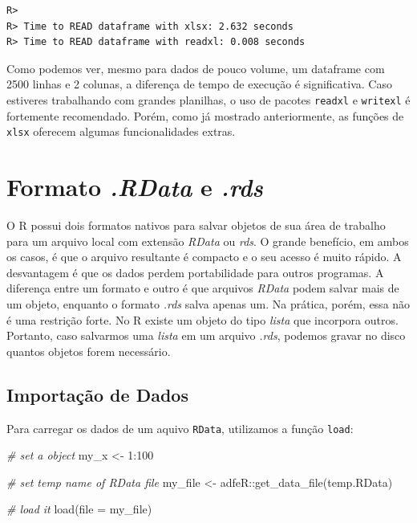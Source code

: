 \documentclass[
  11pt,
]{book}
\newenvironment{Shaded}{\begin{snugshade}}{\end{snugshade}}
\newcommand{\AttributeTok}[1]{\textcolor[rgb]{0.61,0.61,0.61}{#1}}
\newcommand{\CommentTok}[1]{\textcolor[rgb]{0.37,0.37,0.37}{\textit{#1}}}
\newcommand{\DecValTok}[1]{\textcolor[rgb]{0.06,0.06,0.06}{#1}}
\newcommand{\FunctionTok}[1]{\textcolor[rgb]{0,0,0}{#1}}
\newcommand{\NormalTok}[1]{#1}
\newcommand{\OtherTok}[1]{\textcolor[rgb]{0.37,0.37,0.37}{#1}}
\newcommand{\SpecialCharTok}[1]{\textcolor[rgb]{0,0,0}{#1}}
\newcommand{\StringTok}[1]{\textcolor[rgb]{0.5,0.5,0.5}{#1}}
\begin{document}
\begin{verbatim}
R> 
R> Time to READ dataframe with xlsx: 2.632 seconds
R> Time to READ dataframe with readxl: 0.008 seconds
\end{verbatim}

Como podemos ver, mesmo para dados de pouco volume, um dataframe com 2500 linhas e 2 colunas, a diferença de tempo de execução é significativa. Caso estiveres trabalhando com grandes planilhas, o uso de pacotes \texttt{readxl} e \texttt{writexl} é fortemente recomendado. Porém, como já mostrado anteriormente, as funções de \texttt{xlsx} oferecem algumas funcionalidades extras.

\hypertarget{formato-.rdata-e-.rds}{%
\section{\texorpdfstring{Formato \emph{.RData} e \emph{.rds}}{Formato .RData e .rds}}\label{formato-.rdata-e-.rds}}

O R possui dois formatos nativos para salvar objetos de sua área de trabalho para um arquivo local com extensão \emph{RData} ou \emph{rds}. O grande benefício, em ambos os casos, é que o arquivo resultante é compacto e o seu acesso é muito rápido. A desvantagem é que os dados perdem portabilidade para outros programas. A diferença entre um formato e outro é que arquivos \emph{RData} podem salvar mais de um objeto, enquanto o formato \emph{.rds} salva apenas um. Na prática, porém, essa não é uma restrição forte. No R existe um objeto do tipo \emph{lista} que incorpora outros. Portanto, caso salvarmos uma \emph{lista} em um arquivo \emph{.rds}, podemos gravar no disco quantos objetos forem necessário.

\hypertarget{importauxe7uxe3o-de-dados-2}{%
\subsection{Importação de Dados}\label{importauxe7uxe3o-de-dados-2}}

Para carregar os dados de um aquivo \texttt{RData}, utilizamos a função \texttt{load}: 

\begin{Shaded}
\begin{Highlighting}[]
\CommentTok{\# set a object}
\NormalTok{my\_x }\OtherTok{\textless{}{-}} \DecValTok{1}\SpecialCharTok{:}\DecValTok{100}

\CommentTok{\# set temp name of RData file}
\NormalTok{my\_file }\OtherTok{\textless{}{-}}\NormalTok{ adfeR}\SpecialCharTok{::}\FunctionTok{get\_data\_file}\NormalTok{(}\StringTok{\textquotesingle{}temp.RData\textquotesingle{}}\NormalTok{)}

\CommentTok{\# load it}
\FunctionTok{load}\NormalTok{(}\AttributeTok{file =}\NormalTok{ my\_file)}
\end{Highlighting}
\end{Shaded}
\end{document}
